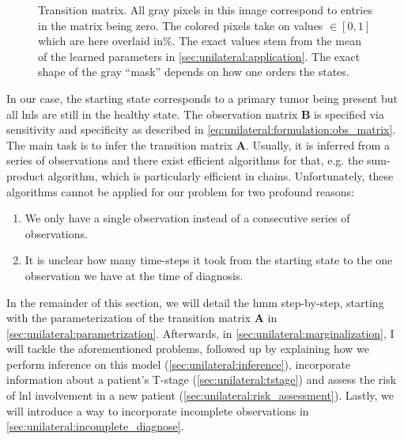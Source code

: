 \documentclass[\relativeRoot/main.tex]{subfiles}
\begin{document}
\begin{figure}
    \centering
    \def\svgwidth{0.8\textwidth}
    
    \caption{Transition matrix. All gray pixels in this image correspond to entries in the matrix being zero. The colored pixels take on values $\in [0, 1]$ which are here overlaid in\%. The exact values stem from the mean of the learned parameters in \cref{sec:unilateral:application}. The exact shape of the gray ``mask'' depends on how one orders the states.}
    \label{fig:unilateral:trans_matrix}
\end{figure}

In our case, the starting state corresponds to a primary tumor being present but all \glspl{lnl} are still in the healthy state. The observation matrix $\mathbf{B}$ is specified via sensitivity and specificity as described in \cref{eq:unilateral:formulation:obs_matrix}. The main task is to infer the transition matrix $\mathbf{A}$. Usually, it is inferred from a series of observations and there exist efficient algorithms for that, e.g. the sum-product algorithm, which is particularly efficient in chains. Unfortunately, these algorithms cannot be applied for our problem for two profound reasons:

\begin{enumerate}
    \item We only have a single observation instead of a consecutive series of observations. 
    \item It is unclear how many time-steps it took from the starting state to the one observation we have at the time of diagnosis.
\end{enumerate}

In the remainder of this section, we will detail the \gls{hmm} step-by-step, starting with the parameterization of the transition matrix $\mathbf{A}$ in \cref{sec:unilateral:parametrization}. Afterwards, in \cref{sec:unilateral:marginalization}, I will tackle the aforementioned problems, followed up by explaining how we perform inference on this model (\cref{sec:unilateral:inference}), incorporate information about a patient’s T-stage (\cref{sec:unilateral:tstage}) and assess the risk of \gls{lnl} involvement in a new patient (\cref{sec:unilateral:risk_assessment}). Lastly, we will introduce a way to incorporate incomplete observations in \cref{sec:unilateral:incomplete_diagnose}.
\end{document}
